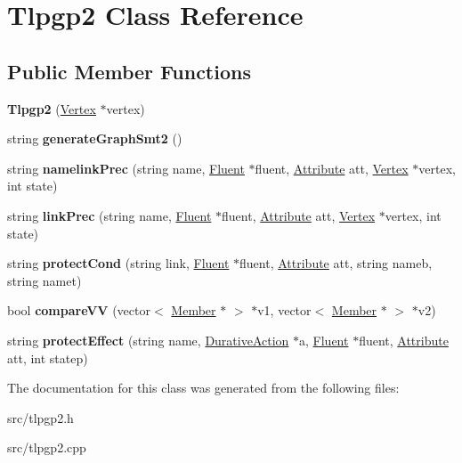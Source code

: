 \hypertarget{classTlpgp2}{\section{Tlpgp2 Class Reference}
\label{classTlpgp2}
}
\subsection*{Public Member Functions}
\begin{DoxyCompactItemize}
\item 
\hypertarget{classTlpgp2_aaf6e32a58dfd9128a90ea596851c1a1e}{{\bfseries Tlpgp2} (\hyperlink{classVertex}{Vertex} $\ast$vertex)}\label{classTlpgp2_aaf6e32a58dfd9128a90ea596851c1a1e}

\item 
\hypertarget{classTlpgp2_ab4d91ec45b002a4b53156d842f212111}{string {\bfseries generate\+Graph\+Smt2} ()}\label{classTlpgp2_ab4d91ec45b002a4b53156d842f212111}

\item 
\hypertarget{classTlpgp2_aed8a6242238a73eea2dc091ddd547bac}{string {\bfseries namelink\+Prec} (string name, \hyperlink{classFluent}{Fluent} $\ast$fluent, \hyperlink{classAttribute}{Attribute} att, \hyperlink{classVertex}{Vertex} $\ast$vertex, int state)}\label{classTlpgp2_aed8a6242238a73eea2dc091ddd547bac}

\item 
\hypertarget{classTlpgp2_a743100501d2300321b164df27b213c81}{string {\bfseries link\+Prec} (string name, \hyperlink{classFluent}{Fluent} $\ast$fluent, \hyperlink{classAttribute}{Attribute} att, \hyperlink{classVertex}{Vertex} $\ast$vertex, int state)}\label{classTlpgp2_a743100501d2300321b164df27b213c81}

\item 
\hypertarget{classTlpgp2_a8feeba8c8905b6589503aab75c7aa163}{string {\bfseries protect\+Cond} (string link, \hyperlink{classFluent}{Fluent} $\ast$fluent, \hyperlink{classAttribute}{Attribute} att, string nameb, string namet)}\label{classTlpgp2_a8feeba8c8905b6589503aab75c7aa163}

\item 
\hypertarget{classTlpgp2_ad328b4c1c7b4d5c0f0b8de682e52e582}{bool {\bfseries compare\+V\+V} (vector$<$ \hyperlink{classMember}{Member} $\ast$ $>$ $\ast$v1, vector$<$ \hyperlink{classMember}{Member} $\ast$ $>$ $\ast$v2)}\label{classTlpgp2_ad328b4c1c7b4d5c0f0b8de682e52e582}

\item 
\hypertarget{classTlpgp2_ad2b83e2998d8206661d309c4105d237a}{string {\bfseries protect\+Effect} (string name, \hyperlink{classDurativeAction}{Durative\+Action} $\ast$a, \hyperlink{classFluent}{Fluent} $\ast$fluent, \hyperlink{classAttribute}{Attribute} att, int statep)}\label{classTlpgp2_ad2b83e2998d8206661d309c4105d237a}

\end{DoxyCompactItemize}


The documentation for this class was generated from the following files\+:\begin{DoxyCompactItemize}
\item 
src/tlpgp2.\+h\item 
src/tlpgp2.\+cpp\end{DoxyCompactItemize}

